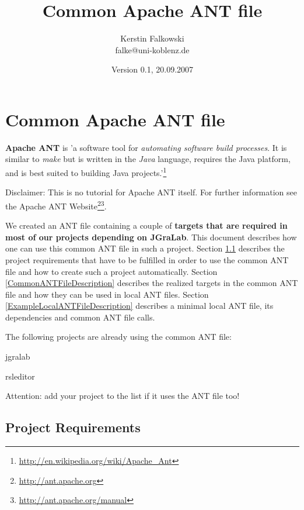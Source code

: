 \documentclass
[
		a4paper,
		twoside, 										
		BCOR10mm,											
		11pt,												
		halfparskip,								
		bigheadings,								
		notitlepage,			
		pdftex											
]
{scrartcl}
\begin{document}
\pagestyle{headings}							

\title{Common Apache ANT file}									
\author{Kerstin Falkowski \\ falke@uni-koblenz.de}
\date{Version 0.1, 20.09.2007}			
\maketitle

\tableofcontents

\section{Common Apache ANT file}
\label{CommonApacheANTFile}

\textbf{Apache ANT} is 'a software tool for \emph{automating software build processes}. It is similar to \emph{make} but is written in the \emph{Java} language, requires the Java platform, and is best suited to building Java projects.'\footnote{\url{http://en.wikipedia.org/wiki/Apache_Ant}}

Disclaimer: This is no tutorial for Apache ANT itself. For further information see the Apache ANT Website\footnote{\url{http://ant.apache.org}}\footnote{\url{http://ant.apache.org/manual}}.

We created an ANT file containing a couple of \textbf{targets that are required in most of our projects depending on JGraLab}. This document describes how one can use this common ANT file in such a project. Section  \ref{ProjectRequirements} describes the project requirements that have to be fulfilled in order to use the common ANT file and how to create such a project automatically. Section \ref{CommonANTFileDescription} describes the realized targets in the common ANT file and how they can be used in local ANT files. Section \ref{ExampleLocalANTFileDescription} describes a minimal local ANT file, its dependencies and common ANT file calls.

The following projects are already using the common ANT file:
\begin{compactitem}
	\item jgralab
	\item rsleditor
\end{compactitem}
Attention: add your project to the list if it uses the ANT file too!


\subsection{Project Requirements}
\label{ProjectRequirements}
\end{document}
